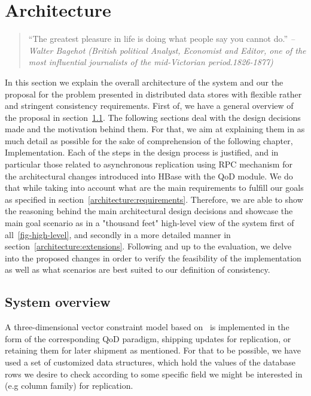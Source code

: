 \chapter{Architecture}
\label{ch:architecture}

\begin{quotation}
“The greatest pleasure in life is doing what people say you cannot do.”
{\small\it -- Walter Bagehot (British political Analyst, Economist and Editor, one of the most influential journalists of the mid-Victorian period.1826-1877) }
\end{quotation}

In this section we explain the overall architecture of the system and our the proposal for the problem presented in distributed data stores with flexible rather and stringent consistency requirements. First of, we have a general overview of the proposal in section~\ref{architecture:overview}. The following sections deal with the design decisions made and the motivation behind them. For that, we aim at explaining them in as much detail as possible for the sake of comprehension of the following chapter, Implementation. Each of the steps in the design process is justified, and in particular those related to asynchronous replication using RPC mechanism for the architectural changes introduced into HBase with the QoD module. We do that while taking into account what are the main requirements to fulfill our goals as specified in section~\ref{architecture:requirements}. Therefore, we are able to show the reasoning behind the main architectural design decisions and showcase the main goal scenario as in a "thousand feet" high-level view of the system first of all~\ref{fig-high-level}, and secondly in a more detailed manner in section~\ref{architecture:extensions}. Following and up to the evaluation, we delve into the proposed changes in order to verify the feasibility of the implementation as well as what scenarios are best suited to our definition of consistency.

\section{System overview}\label{architecture:overview}
A three-dimensional vector constraint model based on~\cite{Santos:2010} is implemented in the form of the corresponding QoD paradigm, shipping updates for replication, or retaining them for later shipment as mentioned. For that to be possible, we have used a set of customized data structures, which hold the values of the database rows we desire to check according to some specific field we might be interested in (e.g column family) for replication. 

